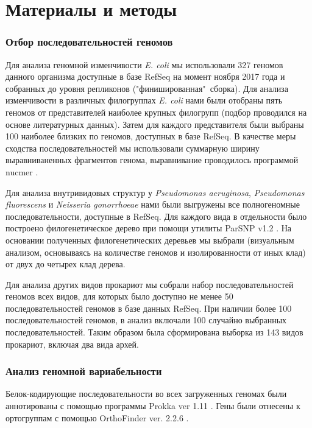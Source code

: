 \chapter{Материалы и методы}
\subsection{Отбор последовательностей геномов}
Для анализа геномной изменчивости \textit{E. coli} мы использовали 327 геномов данного организма доступные в базе RefSeq на момент ноября 2017 года и собранных до уровня репликонов ("финишированная"\ сборка). Для анализа изменчивости в различных филогруппах \textit{E. coli} нами были отобраны пять геномов от представителей наиболее крупных филогрупп (подбор проводился на основе литературных данных). Затем для каждого представителя были выбраны 100 наиболее близких по геномов, доступных в базе RefSeq. В качестве меры сходства последовательностей мы использовали суммарную ширину выравниваненных фрагментов генома, выравнивание проводилось программой nucmer \cite{marccais2018mummer4}. 

Для анализа внутривидовых структур у \textit{Pseudomonas aeruginosa}, \textit{Pseudomonas fluorescens} и \textit{Neisseria gonorrhoeae} нами были выгружены все полногеномные последовательности, доступные в RefSeq. Для каждого вида в отдельности было построено филогенетическое дерево при помощи утилиты ParSNP v1.2 \cite{treangen2014harvest}. На основании полученных филогенетических деревьев мы выбрали (визуальным анализом, основываясь на количестве геномов и изолированности от иных клад) от двух до четырех клад дерева. 

Для анализа других видов прокариот мы собрали набор последовательностей геномов всех видов, для которых было доступно не менее 50 последовательностей геномов в базе данных RefSeq. При наличии более 100 последовательностей геномов, в анализ включали 100 случайно выбранных последовательностей. Таким образом была сформирована выборка из 143 видов прокариот, включая два вида архей.

\subsection{Анализ геномной вариабельности}
Белок-кодирующие последовательности во всех загруженных геномах были аннотированы с помощью программы Prokka ver 1.11 \cite{seemann2014prokka}. Гены были отнесены к ортогруппам с помощью OrthoFinder ver. 2.2.6 \cite{emms2015orthofinder}. 


